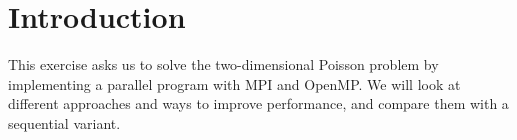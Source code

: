 \section{Introduction}

This exercise asks us to solve the two-dimensional Poisson problem by
implementing a parallel program with MPI and OpenMP. We will look at different
approaches and ways to improve performance, and compare them with a sequential
variant.


